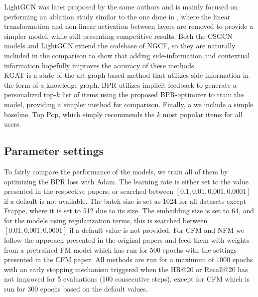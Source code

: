 LightGCN was later proposed by the same authors and is mainly focused on performing an ablation study similar to the one done in \cite{SimplifyingGCN}, where the linear transformation and non-linear activation between layers are removed to provide a simpler model, while still presenting competitive results.
Both the CSGCN models and LightGCN extend the codebase of NGCF, so they are naturally included in the comparison to show that adding side-information and contextual information hopefully improves the accuracy of these methods.\\
KGAT is a state-of-the-art graph-based method that utilizes side-information in the form of a knowledge graph.
BPR utilizes implicit feedback to generate a personalized top-$k$ list of items using the proposed BPR-optimizer to train the model, providing a simpler method for comparison.
Finally, a we include a simple baseline, Top Pop, which simply recommends the $k$ most popular items for all users.

\subsection{Parameter settings}
To fairly compare the performance of the models, we train all of them by optimizing the BPR loss with Adam.
The learning rate is either set to the value presented in the respective papers, or searched between $[0.1, 0.01, 0.001, 0.0001]$ if a default is not available.
The batch size is set as 1024 for all datasets except Frappe, where it is set to 512 due to its size.
The embedding size is set to 64, and for the models using regularization terms, this is searched between $[0.01, 0.001, 0.0001]$ if a default value is not provided.
For CFM and NFM we follow the approach presented in the original papers and feed them with weights from a pretrained FM model which has run for 500 epochs with the settings presented in the CFM paper.
All methods are run for a maximum of 1000 epochs with an early stopping mechanism triggered when the HR@20 or Recall@20 has not improved for 5 evaluations (100 consecutive steps), except for CFM which is run for 300 epochs based on the default values.


